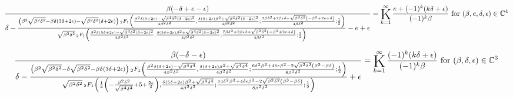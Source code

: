 \documentclass{article}
\newcommand{\bigK}{\mathop{\raisebox{-5pt}{\huge K}}}
\begin{document}
\[\frac{\beta  (-\delta +e-\epsilon )}{\delta -\frac{\left(\beta ^2 \sqrt{\beta ^2 \delta ^2}-\beta  \delta  (3 \delta +2 \epsilon )-\sqrt{\beta ^2 \delta ^2} (\delta +2 e)\right) \, _2F_1\left(\frac{\beta ^2 \delta  (\delta +2 \epsilon )-\sqrt{\beta ^4 \delta ^2 (\delta -2 e)^2}}{4 \beta ^2 \delta ^2},\frac{\delta  (\delta +2 \epsilon ) \beta ^2+\sqrt{\beta ^4 \delta ^2 (\delta -2 e)^2}}{4 \beta ^2 \delta ^2};\frac{3 \beta  \delta ^2+2 \beta  \epsilon  \delta +\sqrt{\beta ^2 \delta ^2} \left(-\beta ^2+2 e+\delta \right)}{4 \beta  \delta ^2};\frac{1}{2}\right)}{\sqrt{\beta ^2 \delta ^2} \, _2F_1\left(\frac{\beta ^2 \delta  (5 \delta +2 \epsilon )-\sqrt{\beta ^4 \delta ^2 (\delta -2 e)^2}}{4 \beta ^2 \delta ^2},\frac{\delta  (5 \delta +2 \epsilon ) \beta ^2+\sqrt{\beta ^4 \delta ^2 (\delta -2 e)^2}}{4 \beta ^2 \delta ^2};\frac{7 \beta  \delta ^2+2 \beta  \epsilon  \delta +\sqrt{\beta ^2 \delta ^2} \left(-\beta ^2+2 e+\delta \right)}{4 \beta  \delta ^2};\frac{1}{2}\right)}-e+\epsilon }=\bigK_{k=1}^{\infty}\frac{e+(-1)^k (k \delta +\epsilon )}{(-1)^k \beta }\text{ for }(\beta ,e,\delta ,\epsilon )\in \mathbb{C}^4\] 

\[\frac{\beta  (-\delta -\epsilon )}{\delta -\frac{\left(\beta ^2 \sqrt{\beta ^2 \delta ^2}-\delta  \sqrt{\beta ^2 \delta ^2}-\beta  \delta  (3 \delta +2 \epsilon )\right) \, _2F_1\left(\frac{\beta ^2 \delta  (\delta +2 \epsilon )-\sqrt{\beta ^4 \delta ^4}}{4 \beta ^2 \delta ^2},\frac{\delta  (\delta +2 \epsilon ) \beta ^2+\sqrt{\beta ^4 \delta ^4}}{4 \beta ^2 \delta ^2};\frac{6 \delta ^2 \beta ^2+4 \delta  \epsilon  \beta ^2-2 \sqrt{\beta ^2 \delta ^2} \left(\beta ^3-\beta  \delta \right)}{8 \beta ^2 \delta ^2};\frac{1}{2}\right)}{\sqrt{\beta ^2 \delta ^2} \, _2F_1\left(\frac{1}{4} \left(-\frac{\beta ^2 \delta ^2}{\sqrt{\beta ^4 \delta ^4}}+5+\frac{2 \epsilon }{\delta }\right),\frac{\delta  (5 \delta +2 \epsilon ) \beta ^2+\sqrt{\beta ^4 \delta ^4}}{4 \beta ^2 \delta ^2};\frac{14 \delta ^2 \beta ^2+4 \delta  \epsilon  \beta ^2-2 \sqrt{\beta ^2 \delta ^2} \left(\beta ^3-\beta  \delta \right)}{8 \beta ^2 \delta ^2};\frac{1}{2}\right)}+\epsilon }=\bigK_{k=1}^{\infty}\frac{(-1)^k (k \delta +\epsilon )}{(-1)^k \beta }\text{ for }(\beta ,\delta ,\epsilon )\in \mathbb{C}^3\] 
\end{document}

